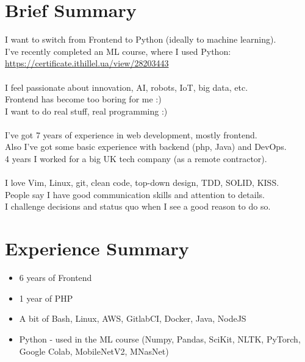 \documentclass[a4paper, 14pt]{article}
\begin{document}
\begin{center}
	\textsc{\Huge{}}
\end{center}


\section{Brief Summary}
  I want to switch from Frontend to Python (ideally to machine learning). \\
  I've recently completed an ML course, where I used Python: \\
  \url{https://certificate.ithillel.ua/view/28203443} \\
  \\
  I feel passionate about innovation, AI, robots, IoT, big data, etc. \\
  Frontend has become too boring for me :) \\
  I want to do real stuff, real programming :) \\
  \\
  I've got 7 years of experience in web development, mostly frontend.  \\
  Also I've got some basic experience with backend (php, Java) and DevOps.  \\
  4 years I worked for a big UK tech company (as a remote contractor). \\
  \\
  I love Vim, Linux, git, clean code, top-down design, TDD, SOLID, KISS. \\
  People say I have good communication skills and attention to details. \\
  I challenge decisions and status quo when I see a good reason to do so.

\section{Experience Summary}
  \begin{itemize}
    \item 6 years of Frontend  \\
    \item 1 year of PHP \\
    \item A bit of Bash, Linux, AWS, GitlabCI, Docker, Java, NodeJS \\
    \item Python - used in the ML course (Numpy, Pandas, SciKit, NLTK, PyTorch, Google Colab, MobileNetV2, MNasNet) 
  \end{itemize}
\end{document}

